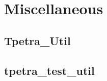 \documentclass[10pt,relax]{TpetraDesign}
\begin{document}
%
\section{Miscellaneous}

\subsection{Tpetra\_Util}
\subsection{tpetra\_test\_util}

%
\clearpage


\end{document}
